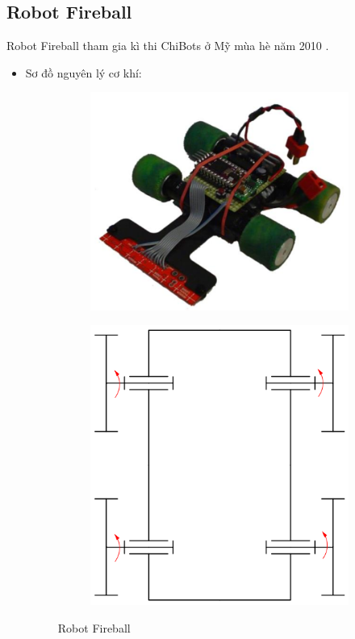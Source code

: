     \subsection{Robot Fireball}
        \hspace*{0.6cm}Robot Fireball tham gia kì thi ChiBots ở Mỹ mùa hè năm 2010 \cite{fireball_robot}.
        \begin{itemize}
            \item Sơ đồ nguyên lý cơ khí:
            \begin{figure}[H]
                \begin{subfigure}{0.5\textwidth}
                \centering
                \includegraphics[width=0.6\linewidth, right]{pictures/chapter1/chapter1_pic13a_fireball.png} 
                \label{chap1_pic13a}
                \end{subfigure}
                \begin{subfigure}{0.6\textwidth}
                \includegraphics[width=0.5\linewidth]{pictures/chapter1/chapter1_pic13b_fireball.png}
                \label{chap1_pic13b}
                \end{subfigure}
                \caption{Robot Fireball}
                \label{chap1_pic13}

\end{figure}
\end{itemize}
